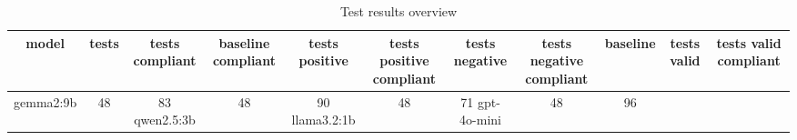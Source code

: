 
  \begin{table}[h!]
  \centering
  \begin{tabular}{|c|c|c|c|c|c|c|c|c|c|c|}
  \hline
  model & tests & tests compliant & baseline compliant & tests positive & tests positive compliant & tests negative & tests negative compliant & baseline & tests valid & tests valid compliant \\
  \hline
  gemma2:9b & 48 & 83%
\hline
qwen2.5:3b & 48 & 90%
\hline
llama3.2:1b & 48 & 71%
\hline
gpt-4o-mini & 48 & 96%
  \end{tabular}
  \caption{Test results overview}
  
  \end{table}
  